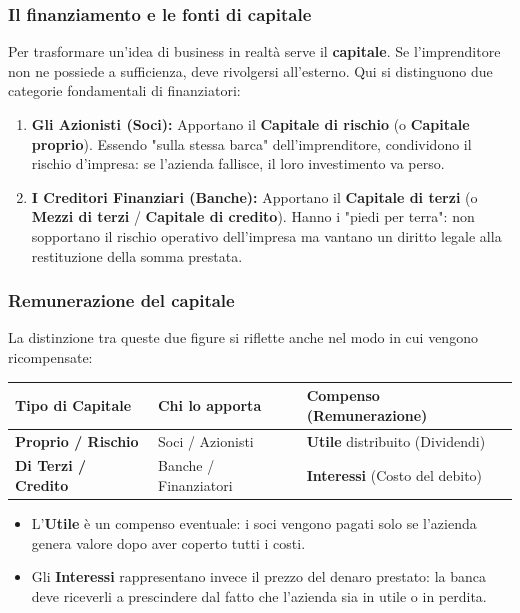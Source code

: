 \documentclass[a4paper,12pt]{article}
\begin{document}
	\subsubsection{Il finanziamento e le fonti di capitale}
	Per trasformare un'idea di business in realtà serve il \textbf{capitale}. Se l'imprenditore non ne possiede a sufficienza, deve rivolgersi all'esterno. Qui si distinguono due categorie fondamentali di finanziatori:
	
	\begin{enumerate}
		\item \textbf{Gli Azionisti (Soci):} Apportano il \textbf{Capitale di rischio} (o \textbf{Capitale proprio}). 
		Essendo "sulla stessa barca" dell'imprenditore, condividono il rischio d'impresa: se l'azienda fallisce, il loro investimento va perso.
		\item \textbf{I Creditori Finanziari (Banche):} Apportano il \textbf{Capitale di terzi} (o \textbf{Mezzi di terzi} / \textbf{Capitale di credito}). 
		Hanno i "piedi per terra": non sopportano il rischio operativo dell'impresa ma vantano un diritto legale alla restituzione della somma prestata.
	\end{enumerate}
	
	\subsubsection{Remunerazione del capitale}
	La distinzione tra queste due figure si riflette anche nel modo in cui vengono ricompensate:
	
	\begin{table}[h!]
		\centering
		\begin{tabular}{@{}lll@{}}
			\toprule
			\textbf{Tipo di Capitale} & \textbf{Chi lo apporta} & \textbf{Compenso (Remunerazione)} \\ \midrule
			\textbf{Proprio / Rischio} & Soci / Azionisti & \textbf{Utile} distribuito (Dividendi) \\
			\textbf{Di Terzi / Credito} & Banche / Finanziatori & \textbf{Interessi} (Costo del debito) \\ \bottomrule
		\end{tabular}
	\end{table}
	
	\begin{itemize}
		\item L'\textbf{Utile} è un compenso eventuale: i soci vengono pagati solo se l'azienda genera valore dopo aver coperto tutti i costi.
		\item Gli \textbf{Interessi} rappresentano invece il prezzo del denaro prestato: la banca deve riceverli a prescindere dal fatto che l'azienda sia in utile o in perdita.
	\end{itemize}
	
\end{document}
